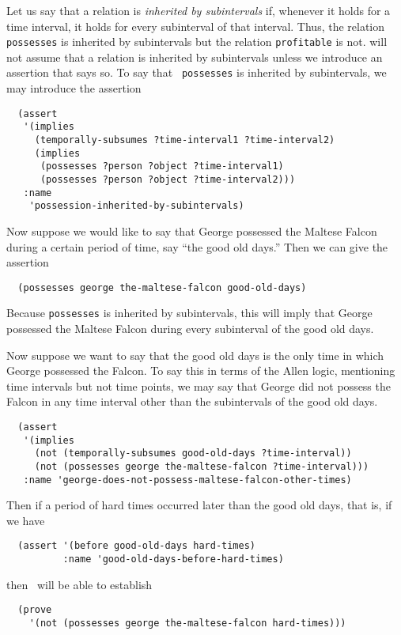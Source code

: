 Let us say that a relation is {\em inherited by subintervals} if, whenever it
 holds for a time interval, it holds for every subinterval of that interval.
 Thus, the relation {\tt possesses} is inherited by subintervals but the
 relation {\tt profitable} is not.
 \Snark\/ will not assume that a relation is inherited by subintervals unless
 we introduce an assertion that says so.  To say that {\tt
 possesses} is inherited by subintervals, we may introduce the assertion
\begin{verbatim}
  (assert
   '(implies
     (temporally-subsumes ?time-interval1 ?time-interval2)
     (implies
      (possesses ?person ?object ?time-interval1)
      (possesses ?person ?object ?time-interval2)))
   :name
    'possession-inherited-by-subintervals)
\end{verbatim}

Now suppose we would like to say that George possessed the Maltese Falcon
during a certain period of time, say ``the good old days.''  Then we can
give the assertion
\begin{verbatim}
  (possesses george the-maltese-falcon good-old-days)
\end{verbatim}
Because {\tt possesses} is inherited by subintervals, this will imply that
George possessed the Maltese Falcon during every subinterval of the good old
days.

Now suppose we want to say that the good old days is the only time in which
George possessed the Falcon.  To say this in terms of the Allen logic,
mentioning time intervals but not time points, we may say that George
did not possess the Falcon in any time interval other than the subintervals
of the good old days.
\begin{verbatim}
  (assert
   '(implies
     (not (temporally-subsumes good-old-days ?time-interval))
     (not (possesses george the-maltese-falcon ?time-interval)))
   :name 'george-does-not-possess-maltese-falcon-other-times)
\end{verbatim}
Then if a period of hard times
occurred later than the good old days, that is, if we have
\begin{verbatim}
  (assert '(before good-old-days hard-times)
          :name 'good-old-days-before-hard-times)
\end{verbatim}
then \snark\  will be able to establish
\begin{verbatim}
  (prove
    '(not (possesses george the-maltese-falcon hard-times)))
\end{verbatim}

